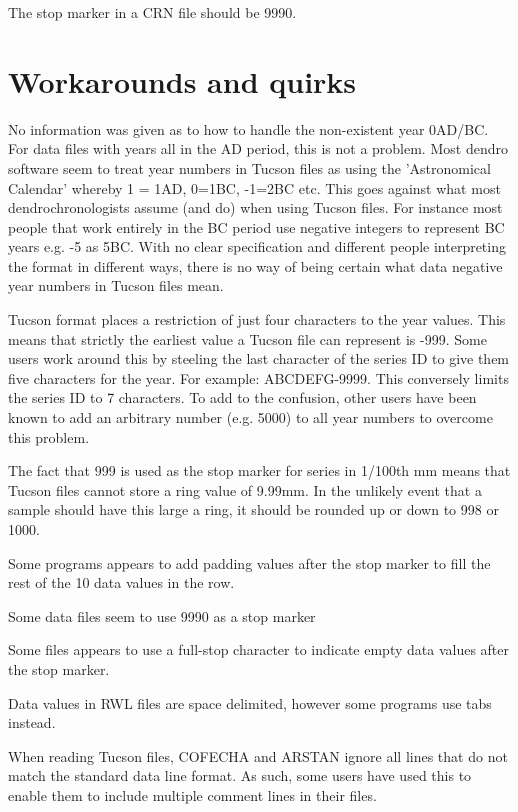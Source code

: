 \documentclass[10pt, headsepline,DIV14,BCOR0.5cm]{scrreprt}
\begin{document}
The stop marker in a CRN file should be 9990. 

\section{Workarounds and quirks}

\begin{itemize*}
\item  No information was given as to how to handle the non-existent year 0AD/BC. For data files with years all in the AD period, this is not a problem. Most dendro software seem to treat year numbers in Tucson files as using the 'Astronomical Calendar' whereby 1 = 1AD, 0=1BC, -1=2BC etc. This goes against what most dendrochronologists assume (and do) when using Tucson files. For instance most people that work entirely in the BC period use negative integers to represent BC years e.g. -5 as 5BC. With no clear specification and different people interpreting the format in different ways, there is no way of being certain what data negative year numbers in Tucson files mean.
\item Tucson format places a restriction of just four characters to the year values. This means that strictly the earliest value a Tucson file can represent is -999. Some users work around this by steeling the last character of the series ID to give them five characters for the year. For example: ABCDEFG-9999. This conversely limits the series ID to 7 characters. To add to the confusion, other users have been known to add an arbitrary number (e.g. 5000) to all year numbers to overcome this problem.
\item  The fact that 999 is used as the stop marker for series in 1/100th mm means that Tucson files cannot store a ring value of 9.99mm. In the unlikely event that a sample should have this large a ring, it should be rounded up or down to 998 or 1000.
\item  Some programs appears to add padding values after the stop marker to fill the rest of the 10 data values in the row.
\item  Some data files seem to use 9990 as a stop marker
\item  Some files appears to use a full-stop character to indicate empty data values after the stop marker.
\item  Data values in RWL files are space delimited, however some programs use tabs instead.
\item  When reading Tucson files, COFECHA and ARSTAN ignore all lines that do not match the standard data line format. As such, some users have used this to enable them to include multiple comment lines in their files.

\end{itemize*}
\end{document}
